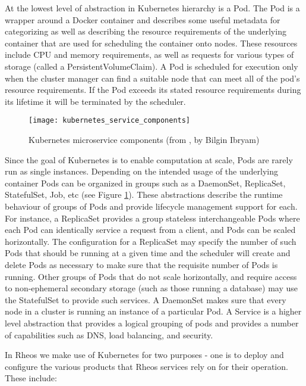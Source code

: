 At the lowest level of abstraction in Kubernetes hierarchy is a Pod. The Pod is a wrapper around a Docker container and describes some useful metadata for categorizing as well as describing the resource requirements of the underlying container that are used for scheduling the container onto nodes. These resources include CPU and memory requirements, as well as requests for various types of storage (called a PersistentVolumeClaim). A Pod is scheduled for execution only when the cluster manager can find a suitable node that can meet all of the pod's resource requirements. If the Pod exceeds its stated resource requirements during its lifetime it will be terminated by the scheduler.

\begin{figure}[htb!]
    \texttt{[image: kubernetes\_service\_components]}
    \centering
    \caption {Kubernetes microservice components (from \autocite{kubernetes_microservice_components}, by Bilgin Ibryam)}
    \label{fig:kubernetes_service_components}
\end{figure}

Since the goal of Kubernetes is to enable computation at scale, Pods are rarely run as single instances. Depending on the intended usage of the underlying container Pods can be organized in groups such as a DaemonSet, ReplicaSet, StatefulSet, Job, etc (see Figure \ref{fig:kubernetes_service_components}). These abstractions describe the runtime behaviour of groups of Pods and provide lifecycle management support for each. For instance, a ReplicaSet provides a group stateless interchangeable Pods where each Pod can identically service a request from a client, and Pods can be scaled horizontally. The configuration for a ReplicaSet may specify the number of such Pods that should be running at a given time and the scheduler will create and delete Pods as necessary to make sure that the requisite number of Pods is running. Other groups of Pods that do not scale horizontally, and require access to non-ephemeral secondary storage (such as those running a database) may use the StatefulSet to provide such services. A DaemonSet makes sure that every node in a cluster is running an instance of a particular Pod. A Service is a higher level abstraction that provides a logical grouping of pods and provides a number of capabilities such as DNS, load balancing, and security.  

In Rheos we make use of Kubernetes for two purposes - one is to deploy and configure the various products that Rheos services rely on for their operation. These include:

